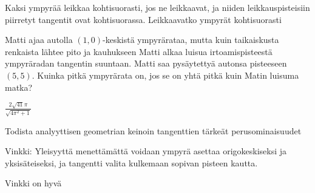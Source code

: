 \begin{tehtavasivu}
\begin{tehtava}
\begin{alakohdat}
\end{alakohdat}
\begin{vastaus}
\begin{alakohdat}
\end{alakohdat}
\end{vastaus}
\end{tehtava}

\begin{tehtava}
Kaksi ympyrää leikkaa kohtisuorasti, jos ne leikkaavat, ja niiden leikkauspisteisiin piirretyt tangentit ovat kohtisuorassa. Leikkaavatko ympyrät kohtisuorasti
\begin{alakohdat}
\end{alakohdat}  
\begin{vastaus}
\begin{alakohdat}
\end{alakohdat}
\end{vastaus}
\end{tehtava}

\begin{tehtava}
Matti ajaa autolla $(1,0)$-keskistä ympyrärataa, mutta kuin taikaiskusta renkaista lähtee pito ja kauhukseen Matti alkaa luisua irtoamispisteestä ympyräradan tangentin suuntaan. Matti saa pysäytettyä autonsa pisteeseen $(5,5)$. Kuinka pitkä ympyrärata on, jos se on yhtä pitkä kuin Matin luisuma matka?
\begin{vastaus}
$\frac{2\sqrt{41}\pi}{\sqrt{4\pi^2+1}}$
\end{vastaus}
\end{tehtava}

\begin{tehtava}
Todista analyyttisen geometrian keinoin tangenttien tärkeät perusominaisuudet
\begin{alakohdat}
\end{alakohdat}
Vinkki: Yleisyyttä menettämättä voidaan ympyrä asettaa origokeskiseksi ja yksisäteiseksi, ja tangentti valita kulkemaan sopivan pisteen kautta.
\begin{vastaus}
Vinkki on hyvä
\end{vastaus}
\end{tehtava}


\end{tehtavasivu}
